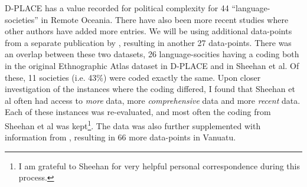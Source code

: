 \documentclass[a4paper,10pt]{article} %
\begin{document}
D-PLACE has a value recorded for political complexity for 44 ``language-societies'' in Remote Oceania. There have also been more recent studies where other authors have added more entries. We will be using additional data-points from a separate publication by \citet{sheehan2018coevolution}, resulting in another 27 data-points. There was an overlap between these two datasets, 26 language-socities having a coding both in the original Ethnographic Atlas dataset in D-PLACE and in Sheehan et al. Of these, 11 societies (i.e. 43\%) were coded exactly the same. Upon closer investigation of the instances where the coding differed, I found that Sheehan et al often had access to \textit{more} data, more \textit{comprehensive} data and more \textit{recent} data. Each of these instances was re-evaluated, and most often the coding from Sheehan et al was kept\footnote{I am grateful to Sheehan for very helpful personal correspondence during this process.}. The data was also further supplemented with information from \citet[201]{bonnemaison1996graded}, resulting in 66 more data-points in Vanuatu. 




\end{document}
